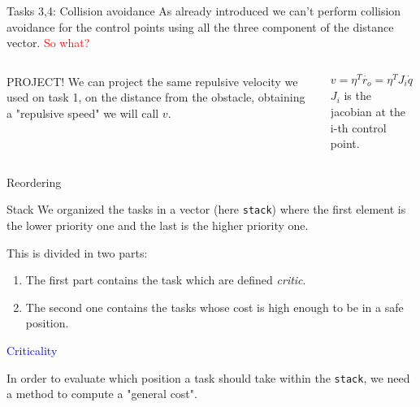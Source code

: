 \documentclass[11pt]{beamer}
\begin{document}
\begin{frame}{Tasks 3,4: Collision avoidance}
As already introduced we can't perform collision avoidance for the control points using all the three component of the distance vector. \textcolor{red}{So what?}
\begin{columns}
\begin{column}{.5\textwidth}
\begin{block}{PROJECT!}
We can project the same repulsive velocity we used on task 1, on the distance from the obstacle, obtaining a "repulsive speed" we will call $v$.
\end{block}
\end{column}
\begin{column}{.5\textwidth}
\begin{equation*}
v = \eta^T\dot{r_{o}} = \eta^T J_i\dot{q} = J_{c,i}\dot{q}
\end{equation*}
$J_i$ is the jacobian at the i-th control point.
\end{column}
\end{columns}
\end{frame}

\begin{frame}{Reordering}

\begin{block}{Stack}
We organized the tasks in a vector (here \texttt{stack}) where the first element is the lower priority one and the last is the higher priority one.
\end{block}
This is divided in two parts:
\begin{enumerate}
\item The first part contains the task which are defined \textit{critic}.
\item The second one contains the tasks whose cost is high enough to be in a safe position.
\end{enumerate}

\textcolor{blue}{Criticality}

In order to evaluate which position a task should take within the \texttt{stack}, we need a method to compute a "general cost".
\end{frame}
\end{document}
